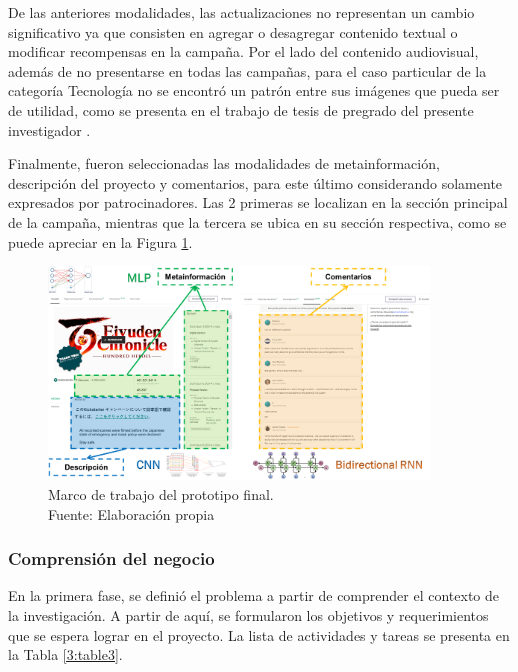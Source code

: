 De las anteriores modalidades, las actualizaciones no representan un cambio significativo ya que consisten en agregar o desagregar contenido textual o modificar recompensas en la campaña. Por el lado del contenido audiovisual, además de no presentarse en todas las campañas, para el caso particular de la categoría Tecnología no se encontró un patrón entre sus imágenes que pueda ser de utilidad, como se presenta en el trabajo de tesis de pregrado del presente investigador \parencite{pr_puente2019kickstarter_prediction}.

Finalmente, fueron seleccionadas las modalidades de metainformación, descripción del proyecto y comentarios, para este último considerando solamente expresados por patrocinadores. Las 2 primeras se localizan en la sección principal de la campaña, mientras que la tercera se ubica en su sección respectiva, como se puede apreciar en la Figura \ref{3:fig3}.
\begin{figure}[htbp]
	\begin{center}
		\includegraphics[width=0.90\textwidth]{3/figures/framework.png}
		\caption[Marco de trabajo del prototipo final]{Marco de trabajo del prototipo final.\\
			Fuente: Elaboración propia}
		\label{3:fig3}
	\end{center}
\end{figure}

\newpage
\subsubsection{Comprensión del negocio}
En la primera fase, se definió el problema a partir de comprender el contexto de la investigación. A partir de aquí, se formularon los objetivos y requerimientos que se espera lograr en el proyecto. La lista de actividades y tareas se presenta en la Tabla \ref{3:table3}.


